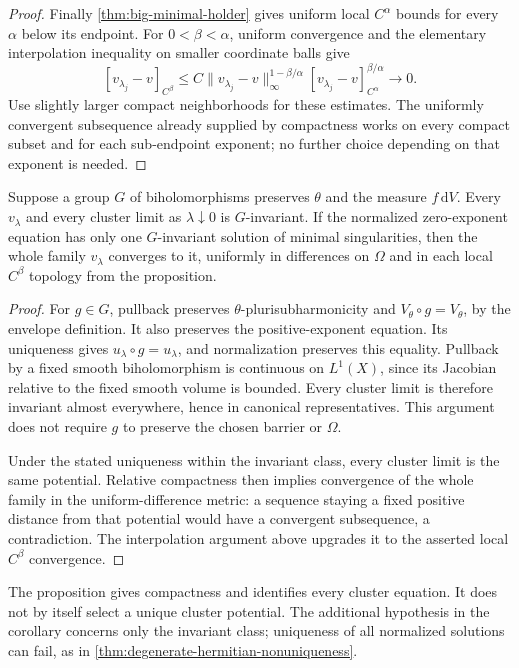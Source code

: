 \begin{proof}
Finally \cref{thm:big-minimal-holder} gives uniform local $C^\alpha$
bounds for every $\alpha$ below its endpoint. For
$0<\beta<\alpha$, uniform convergence and the elementary interpolation
inequality on smaller coordinate balls give
\[
 [v_{\lambda_j}-v]_{C^\beta}
 \leq C\|v_{\lambda_j}-v\|_\infty^{1-\beta/\alpha}
          [v_{\lambda_j}-v]_{C^\alpha}^{\beta/\alpha}
 \longrightarrow0.
\]
Use slightly larger compact neighborhoods for these estimates. The
uniformly convergent subsequence already supplied by compactness works
on every compact subset and for each sub-endpoint exponent; no further
choice depending on that exponent is needed.
\end{proof}

\begin{corollary}\label{cor:big-exponential-symmetries}
Suppose a group $G$ of biholomorphisms preserves $\theta$ and the measure
$f\,\mathrm{d}V$. Every $v_\lambda$ and every cluster limit as
$\lambda\downarrow0$ is $G$-invariant. If the normalized zero-exponent
equation has only one $G$-invariant solution of minimal singularities,
then the whole family $v_\lambda$ converges to it, uniformly in
differences on $\Omega$ and in each local $C^\beta$ topology from the
proposition.
\end{corollary}
\begin{proof}
For $g\in G$, pullback preserves $\theta$-plurisubharmonicity and
$V_\theta\circ g=V_\theta$, by the envelope definition. It also
preserves the positive-exponent equation. Its uniqueness gives
$u_\lambda\circ g=u_\lambda$, and normalization preserves this equality.
Pullback by a fixed smooth biholomorphism is continuous on $L^1(X)$,
since its Jacobian relative to the fixed smooth volume is bounded.
Every cluster limit is therefore invariant almost everywhere, hence in
canonical representatives. This argument does not require $g$ to
preserve the chosen barrier or $\Omega$.

Under the stated uniqueness within the invariant class, every cluster
limit is the same potential. Relative compactness then implies
convergence of the whole family in the uniform-difference metric:
a sequence staying a fixed positive distance from that potential would
have a convergent subsequence, a contradiction. The interpolation
argument above upgrades it to the asserted local $C^\beta$ convergence.
\end{proof}

The proposition gives compactness and identifies every cluster equation.
It does not by itself select a unique cluster potential. The additional
hypothesis in the corollary concerns only the invariant class; uniqueness
of all normalized solutions can fail, as in
\cref{thm:degenerate-hermitian-nonuniqueness}.
